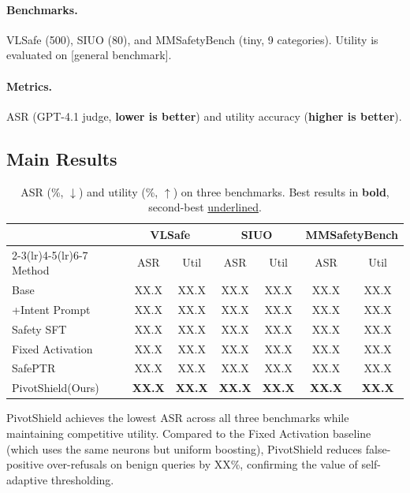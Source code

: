 \documentclass{article}
\newcommand{\method}{PivotShield\xspace}
\begin{document}
\paragraph{Benchmarks.}
VLSafe (500), SIUO (80), and MMSafetyBench (tiny, 9 categories).
Utility is evaluated on [general benchmark].

\paragraph{Metrics.}
ASR (GPT-4.1 judge, \textbf{lower is better}) and
utility accuracy (\textbf{higher is better}).

\subsection{Main Results}

\begin{table}[t]
  \caption{ASR (\%, $\downarrow$) and utility (\%, $\uparrow$) on
  three benchmarks. Best results in \textbf{bold},
  second-best \underline{underlined}.}
  \label{tab:main}
  \centering
  \small
  \setlength{\tabcolsep}{4pt}
  \begin{tabular}{lcccccc}
    \toprule
    & \multicolumn{2}{c}{VLSafe} &
      \multicolumn{2}{c}{SIUO} &
      \multicolumn{2}{c}{MMSafetyBench} \\
    \cmidrule(lr){2-3}\cmidrule(lr){4-5}\cmidrule(lr){6-7}
    Method & ASR & Util & ASR & Util & ASR & Util \\
    \midrule
    Base               & XX.X & XX.X & XX.X & XX.X & XX.X & XX.X \\
    +Intent Prompt     & XX.X & XX.X & XX.X & XX.X & XX.X & XX.X \\
    Safety SFT         & XX.X & XX.X & XX.X & XX.X & XX.X & XX.X \\
    Fixed Activation   & XX.X & XX.X & XX.X & XX.X & XX.X & XX.X \\
    SafePTR            & XX.X & XX.X & XX.X & XX.X & XX.X & XX.X \\
    \midrule
    \method (Ours)     & \textbf{XX.X} & \textbf{XX.X} &
                         \textbf{XX.X} & \textbf{XX.X} &
                         \textbf{XX.X} & \textbf{XX.X} \\
    \bottomrule
  \end{tabular}
\end{table}

\method achieves the lowest ASR across all three benchmarks while
maintaining competitive utility.
Compared to the Fixed Activation baseline (which uses the same
neurons but uniform boosting), \method reduces false-positive
over-refusals on benign queries by XX\%, confirming the value of
self-adaptive thresholding.
\end{document}
